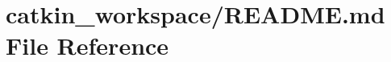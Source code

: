 \hypertarget{deliverables_2doxygen_2catkin__workspace_2_r_e_a_d_m_e_8md}{}\section{catkin\+\_\+workspace/\+R\+E\+A\+D\+ME.md File Reference}
\label{deliverables_2doxygen_2catkin__workspace_2_r_e_a_d_m_e_8md}
